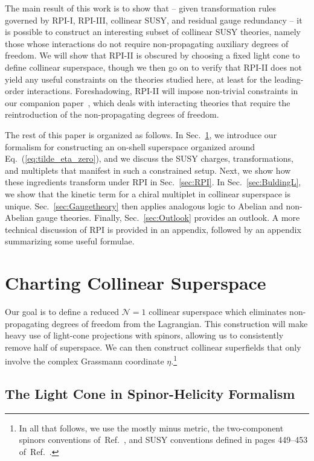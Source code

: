 \documentclass[12pt,document,nofootinbib,superscriptaddress,onecolumn,preprintnumbers,balancelastpage]{article}
\DeclareRobustCommand{\Sec}[1]{Sec.~\ref{#1}}
\DeclareRobustCommand{\Eq}[1]{Eq.~(\ref{#1})}
\DeclareRobustCommand{\Ref}[1]{Ref.~\cite{#1}}
\begin{document}
\begin{spacing}{1.2}
The main result of this work is to show that -- given transformation rules governed by RPI-I, RPI-III, collinear SUSY, and residual gauge redundancy -- it is possible to construct an interesting subset of collinear SUSY theories, namely those whose interactions do not require non-propagating auxiliary degrees of freedom.
%
We will show that RPI-II is obscured by choosing a fixed light cone to define collinear superspace, though we then go on to verify that RPI-II does not yield any useful constraints on the theories studied here, at least for the leading-order interactions.
%
Foreshadowing, RPI-II will impose non-trivial constraints in our companion paper~\cite{Cohen:2019gsc}, which deals with interacting theories that require the reintroduction of the non-propagating degrees of freedom.



The rest of this paper is organized as follows.
%
In \Sec{sec:formalism}, we introduce our formalism for constructing an on-shell superspace organized around \Eq{eq:tilde_eta_zero}, and we discuss the SUSY charges, transformations, and multiplets that manifest in such a constrained setup.
%
Next, we show how these ingredients transform under RPI in \Sec{sec:RPI}.
%
In \Sec{sec:BuldingL}, we show that the kinetic term for a chiral multiplet in collinear superspace is unique.
%
\Sec{sec:Gaugetheory} then applies analogous logic to Abelian and non-Abelian gauge theories.
%
Finally, \Sec{sec:Outlook} provides an outlook.
%
A more technical discussion of RPI is provided in an appendix, followed by an appendix summarizing some useful formulae. 


\section{Charting Collinear Superspace}
\label{sec:formalism}
Our goal is to define a reduced $\mathcal{N} = 1$ collinear superspace which eliminates non-propagating degrees of freedom from the Lagrangian.
%
This construction will make heavy use of light-cone projections with spinors, allowing us to consistently remove half of superspace.
%
We can then construct collinear superfields that only involve the complex Grassmann coordinate $\eta$.\footnote{In all that follows, we use the mostly minus metric, the two-component spinors conventions of~\Ref{Dreiner:2008tw}, and  SUSY conventions defined in pages 449--453 of~\Ref{Binetruy:2006ad}.}

\subsection{The Light Cone in Spinor-Helicity Formalism}
\label{subsec:spinor_proj}


\end{spacing}
\end{document}
